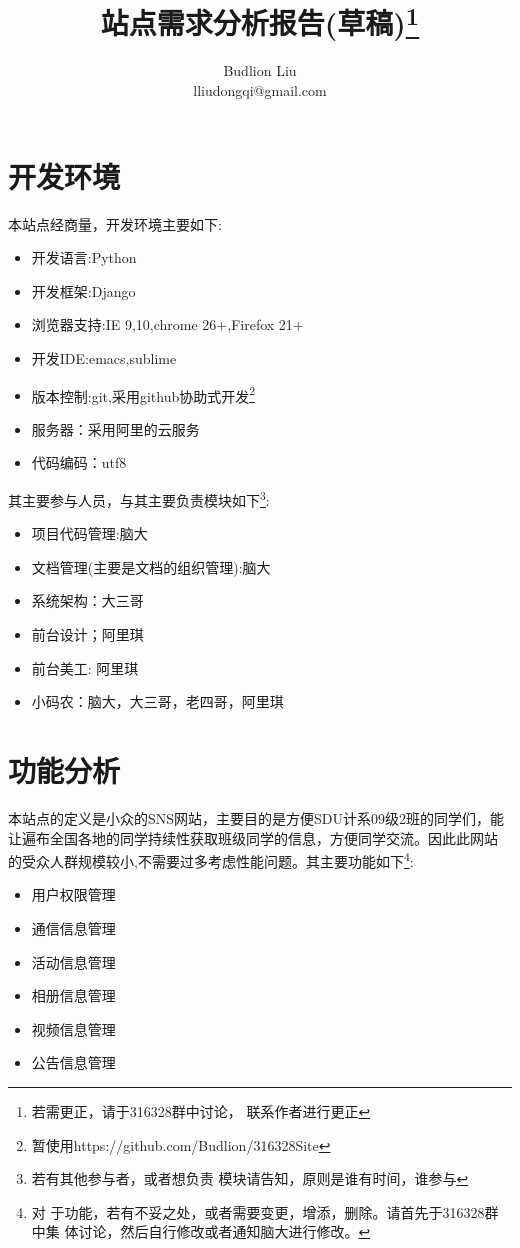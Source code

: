 \documentclass[12pt,a4paper,twocolumn]{article}
\begin{document}
\title{站点需求分析报告(草稿)\footnote{若需更正，请于316328群中讨论，
    联系作者进行更正}}
\author{Budlion Liu\\lliudongqi@gmail.com}
\maketitle
\section{开发环境}
本站点经商量，开发环境主要如下:
\begin{itemize}
\item 开发语言:Python
\item 开发框架:Django
\item 浏览器支持:IE 9,10,chrome 26+,Firefox 21+
\item 开发IDE:emacs,sublime
\item 版本控制:git,采用github协助式开发\footnote{暂使用https://github.com/Budlion/316328Site}
\item 服务器：采用阿里的云服务
\item 代码编码：utf8
\end{itemize}
其主要参与人员，与其主要负责模块如下\footnote{若有其他参与者，或者想负责
  模块请告知，原则是谁有时间，谁参与}:
\begin{itemize}
\item 项目代码管理:脑大
\item 文档管理(主要是文档的组织管理):脑大
\item 系统架构：大三哥
\item 前台设计；阿里琪
\item 前台美工: 阿里琪
\item 小码农：脑大，大三哥，老四哥，阿里琪
\end{itemize}
\section{功能分析}
本站点的定义是小众的SNS网站，主要目的是方便SDU计系09级2班的同学们，能
让遍布全国各地的同学持续性获取班级同学的信息，方便同学交流。因此此网站
的受众人群规模较小,不需要过多考虑性能问题。其主要功能如下\footnote{对
  于功能，若有不妥之处，或者需要变更，增添，删除。请首先于316328群中集
  体讨论，然后自行修改或者通知脑大进行修改。}:
\begin{itemize}
\item 用户权限管理
\item 通信信息管理
\item 活动信息管理
\item 相册信息管理
\item 视频信息管理
\item 公告信息管理
\end{itemize}
\end{document}
